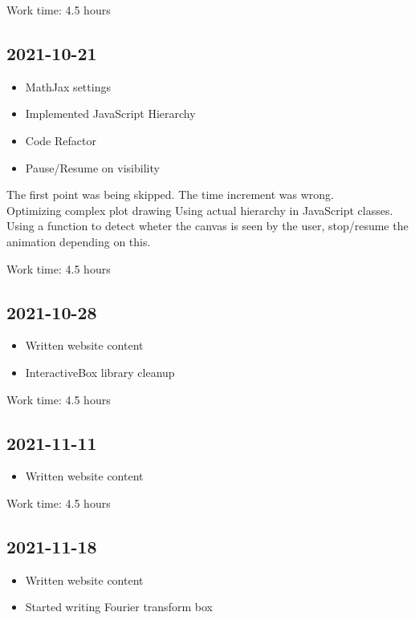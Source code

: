 \documentclass{article}
\begin{document}
Work time: 4.5 hours

\subsection*{2021-10-21}

\begin{itemize}
    \item MathJax settings
    \item Implemented JavaScript Hierarchy
    \item Code Refactor
    \item Pause/Resume on visibility
\end{itemize}

The first point was being skipped. The time increment was wrong.
\\
Optimizing complex plot drawing
Using actual hierarchy in JavaScript classes.
Using a function to detect wheter the canvas is seen by the user,
stop/resume the animation depending on this.

Work time: 4.5 hours

\subsection*{2021-10-28}

\begin{itemize}
    \item Written website content
    \item InteractiveBox library cleanup
\end{itemize}

Work time: 4.5 hours

\subsection*{2021-11-11}

\begin{itemize}
    \item Written website content
\end{itemize}

Work time: 4.5 hours

\subsection*{2021-11-18}

\begin{itemize}
    \item Written website content
    \item Started writing Fourier transform box
\end{itemize}
\end{document}
